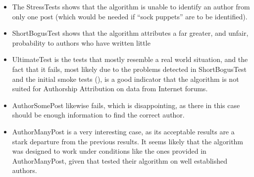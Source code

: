 \begin{itemize}
\item The StressTests shows that the algorithm is unable to identify an author from only one post (which would be needed if ``sock puppets'' are to be identified). 
\item ShortBogusTest shows that the algorithm attributes a far greater, and unfair, probability to authors who have written little
\item UltimateTest is the tests that mostly resemble a real world situation, and the fact that it fails, most likely due to the problems detected in ShortBogusTest and the initial smoke tests (), is a good indicator that the algorithm is not suited for Authorship Attribution on data from Internet forums.
\item AuthorSomePost likewise fails, which is disappointing, as there in this case should be enough information to find the correct author.
\item AuthorManyPost is a very interesting case, as its acceptable results are a stark departure from the previous results. It seems likely that the algorithm was designed to work under conditions like the ones provided in AuthorManyPost, given that \cite{nr4} tested their algorithm on well established authors.
\end{itemize}


